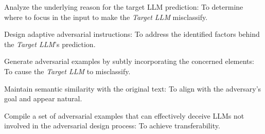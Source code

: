 \documentclass[11pt]{article}
\newcommand \targetLLM[0]{\textsl{Target LLM}}
\begin{document}
    \noindent {} Analyze the underlying reason for the target LLM prediction: To determine where to focus in the input to make the \targetLLM{} misclassify.
    
    \noindent {} Design adaptive adversarial instructions: To address the identified factors behind the \targetLLM's prediction.
    
    \noindent {} Generate adversarial examples by subtly incorporating the concerned elements: To cause the \targetLLM{} to misclassify.
    
    \noindent {} Maintain semantic similarity with the original text: To align with the adversary's goal and appear natural.
    
    \noindent {} Compile a set of adversarial examples that can effectively deceive LLMs not involved in the adversarial design process: To achieve transferability.









\end{document}
